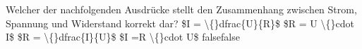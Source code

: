    {Welcher der nachfolgenden Ausdrücke stellt den Zusammenhang zwischen Strom, Spannung und Widerstand korrekt dar?}
    {\$I = \textbackslash\{\}dfrac\{U\}\{R\}\$}
    {\$R = U \textbackslash\{\}cdot I\$}
    {\$R = \textbackslash\{\}dfrac\{I\}\{U\}\$}
    {\$I =R \textbackslash\{\}cdot U\$}
    {false}{false}